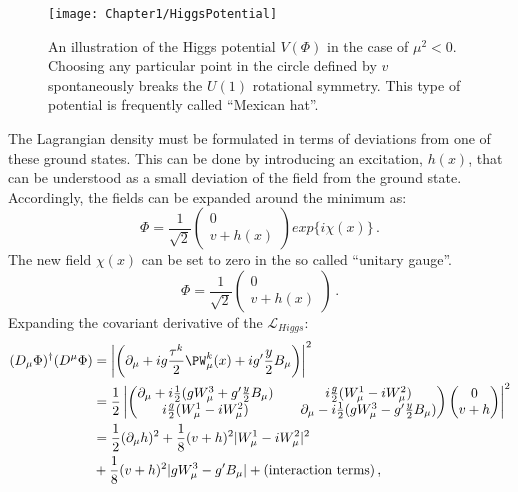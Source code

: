 \begin{figure}
    \centering
    \texttt{[image: Chapter1/HiggsPotential]}
    \caption{An illustration of the Higgs potential $V(\Phi)$ in the case of $\mu^{2}<0$. Choosing any particular point in the circle defined by $v$ spontaneously breaks the $U(1)$ rotational symmetry. This type of potential is
    frequently called ``Mexican hat''.}
    \label{fig:Chap1:SM:HiggsMechanism:Potential}
\end{figure}

The Lagrangian density must be formulated in terms of deviations from one of these
ground states. This can be done by introducing an excitation, $h(x)$, that can be understood
as a small deviation of the field from the ground state. 
Accordingly, the fields can be expanded around the minimum as:
\begin{equation*}
	\Phi = \frac{1}{\sqrt{2}} \begin{pmatrix}  0 \\ v+h(x)  \end{pmatrix} exp\{  i \chi(x)\}\, .
\end{equation*}
The new field $\chi(x)$ can be set to zero in the so called ``unitary gauge''.
\begin{equation}\label{eq:chap1:HiggsMechanism:SymmetryBreaking}
	\Phi = \frac{1}{\sqrt{2}} \begin{pmatrix}  0 \\ v+h(x)  \end{pmatrix} \, .
\end{equation}
Expanding the covariant derivative of the $\mathcal{L}_{Higgs}$:
\begin{equation*}\label{eq:chap1:HiggsMechanism:Covariant}
\begin{split}
	 (D_{\mu} \Phi)^{\dagger}(D^{\mu} \Phi) 	&=\left\lvert \left( \partial_{\mu} + ig  \frac{\tau^{k}}{2} \PW_{\mu}^{k} (x)+  ig'  \frac{y}{2} B_{\mu}  \right)\right\rvert^{2}  \\
									&= \frac{1}{2} \left\lvert \begin{pmatrix}   \partial_{\mu} +i\frac{1}{2}(gW^{3}_{\mu}+g'\frac{y}{2} B_{\mu}) && i\frac{g}{2}(W^{1}_{\mu}-iW^{2}_{\mu}) \\
									i\frac{g}{2}(W^{1}_{\mu}-iW^{2}_{\mu})  && \partial_{\mu} -i\frac{1}{2}(gW^{3}_{\mu}-g'\frac{y}{2} B_{\mu})
									 \end{pmatrix}   \begin{pmatrix}  0 \\ v+h  \end{pmatrix}\right\rvert ^{2} \\
									 &= \frac{1}{2}(\partial_{\mu} h)^{2} + \frac{1}{8}(v+h)^{2}|W^{1}_{\mu}-iW^{2}_{\mu}|^{2} \\
									 &+  \frac{1}{8}(v+h)^{2}|gW^{3}_{\mu}-g'B_{\mu}| +(\textrm{interaction terms}) \, ,
\end{split}
\end{equation*} %
